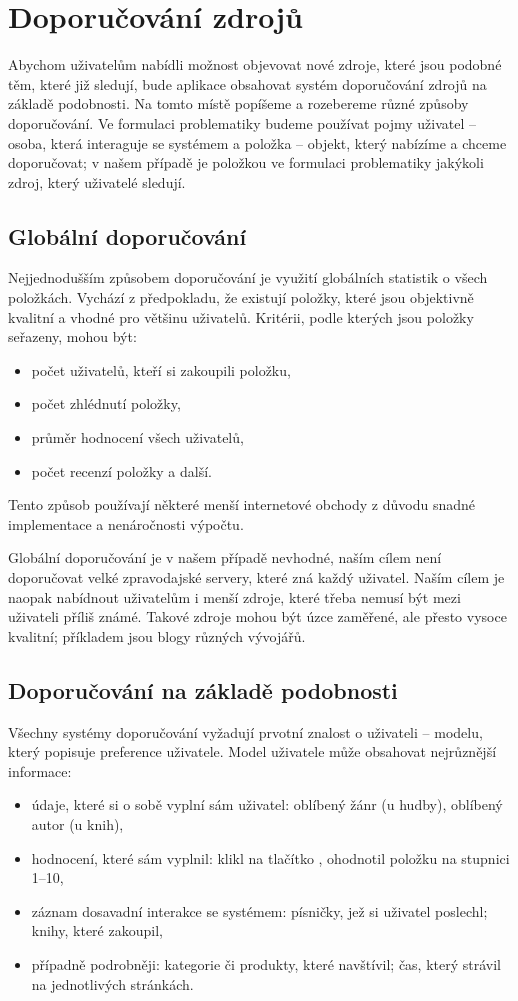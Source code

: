\chapter{Doporučování zdrojů}

Abychom uživatelům nabídli možnost objevovat nové zdroje, které jsou podobné těm, které již sledují, bude aplikace obsahovat systém doporučování zdrojů na základě podobnosti.
Na tomto místě popíšeme a rozebereme různé způsoby doporučování.
Ve formulaci problematiky budeme používat pojmy uživatel -- osoba, která interaguje se systémem a položka -- objekt, který nabízíme a chceme doporučovat; v našem případě je položkou ve formulaci problematiky jakýkoli zdroj, který uživatelé sledují.

\section{Globální doporučování}

Nejjednodušším způsobem doporučování je využití globálních statistik o všech položkách.
Vychází z předpokladu, že existují položky, které jsou objektivně kvalitní a vhodné pro většinu uživatelů.
Kritérii, podle kterých jsou položky seřazeny, mohou být:
\begin{itemize}
    \item počet uživatelů, kteří si zakoupili položku,
    \item počet zhlédnutí položky,
    \item průměr hodnocení všech uživatelů,
	\item počet recenzí položky a další.
\end{itemize}
Tento způsob používají některé menší internetové obchody z důvodu snadné implementace a nenáročnosti výpočtu.

Globální doporučování je v našem případě nevhodné, naším cílem není doporučovat velké zpravodajské servery, které zná každý uživatel.
Naším cílem je naopak nabídnout uživatelům i menší zdroje, které třeba nemusí být mezi uživateli příliš známé.
Takové zdroje mohou být úzce zaměřené, ale přesto vysoce kvalitní; příkladem jsou blogy různých vývojářů.

\section{Doporučování na základě podobnosti}

Všechny systémy doporučování vyžadují prvotní znalost o uživateli -- modelu, který popisuje preference uživatele.
Model uživatele může obsahovat nejrůznější informace:
\begin{itemize}
    \item údaje, které si o sobě vyplní sám uživatel: oblíbený žánr (u hudby), oblíbený autor (u knih),
    \item hodnocení, které sám vyplnil: klikl na tlačítko , ohodnotil položku na stupnici 1--10,
    \item záznam dosavadní interakce se systémem: písničky, jež si uživatel poslechl; knihy, které zakoupil,
	\item případně podrobněji: kategorie či produkty, které navštívil; čas, který strávil na jednotlivých stránkách.
\end{itemize}

